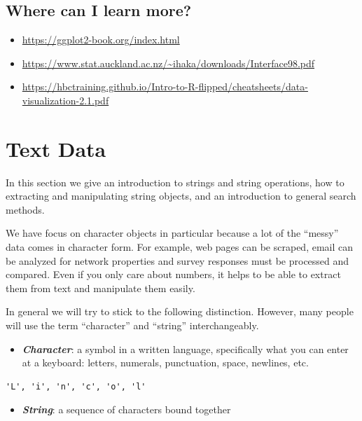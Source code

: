 \documentclass[
]{book}
\providecommand{\tightlist}{%
  \setlength{\itemsep}{0pt}\setlength{\parskip}{0pt}}
\begin{document}
\hypertarget{where-can-i-learn-more}{%
\section{Where can I learn more?}\label{where-can-i-learn-more}}

\begin{itemize}
\item
  \url{https://ggplot2-book.org/index.html}
\item
  \url{https://www.stat.auckland.ac.nz/~ihaka/downloads/Interface98.pdf}
\item
  \url{https://hbctraining.github.io/Intro-to-R-flipped/cheatsheets/data-visualization-2.1.pdf}
\end{itemize}

\hypertarget{text-data}{%
\chapter{Text Data}\label{text-data}}

In this section we give an introduction to strings and string operations, how to extracting and manipulating string objects, and an introduction to general search methods.

We have focus on character objects in particular because a lot of the ``messy'' data comes in character form. For example, web pages can be scraped, email can be analyzed for network properties and survey responses must be processed and compared. Even if you only care about numbers, it helps to be able to extract them from text and manipulate them easily.

In general we will try to stick to the following distinction. However, many people will use the term ``character'' and ``string'' interchangeably.

\begin{itemize}
\tightlist
\item
  \textbf{\emph{Character}}: a symbol in a written language, specifically what you can enter at a keyboard: letters, numerals, punctuation, space, newlines, etc.
\end{itemize}

\begin{verbatim}
'L', 'i', 'n', 'c', 'o', 'l'
\end{verbatim}

\begin{itemize}
\tightlist
\item
  \textbf{\emph{String}}: a sequence of characters bound together
\end{itemize}
\end{document}
